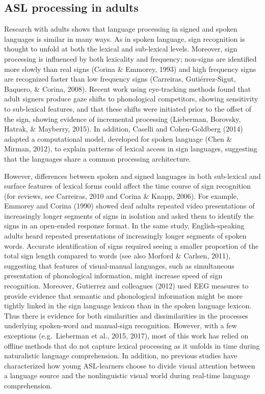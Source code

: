 \documentclass[oneside]{report}
\begin{document}
\subsection{ASL processing in adults}\label{asl-processing-in-adults}

Research with adults shows that language processing in signed and spoken
languages is similar in many ways. As in spoken language, sign
recognition is thought to unfold at both the lexical and sub-lexical
levels. Moreover, sign processing is influenced by both lexicality and
frequency; non-signs are identified more slowly than real signs (Corina
\& Emmorey, 1993) and high frequency signs are recognized faster than
low frequency signs (Carreiras, Gutiérrez-Sigut, Baquero, \& Corina,
2008). Recent work using eye-tracking methods found that adult signers
produce gaze shifts to phonological competitors, showing sensitivity to
sub-lexical features, and that these shifts were initiated prior to the
offset of the sign, showing evidence of incremental processing
(Lieberman, Borovsky, Hatrak, \& Mayberry, 2015). In addition, Caselli
and Cohen-Goldberg (2014) adapted a computational model, developed for
spoken language (Chen \& Mirman, 2012), to explain patterns of lexical
access in sign languages, suggesting that the languages share a common
processing architecture.

However, differences between spoken and signed languages in both
sub-lexical and surface features of lexical forms could affect the time
course of sign recognition (for reviews, see Carreiras, 2010 and Corina
\& Knapp, 2006). For example, Emmorey and Corina (1990) showed deaf
adults repeated video presentations of increasingly longer segments of
signs in isolation and asked them to identify the signs in an open-ended
response format. In the same study, English-speaking adults heard
repeated presentations of increasingly longer segments of spoken words.
Accurate identification of signs required seeing a smaller proportion of
the total sign length compared to words (see also Morford \& Carlsen,
2011), suggesting that features of visual-manual languages, such as
simultaneous presentation of phonological information, might increase
speed of sign recognition. Moreover, Gutierrez and colleagues (2012)
used EEG measures to provide evidence that semantic and phonological
information might be more tightly linked in the sign language lexicon
than in the spoken language lexicon. Thus there is evidence for both
similarities and dissimilarities in the processes underlying spoken-word
and manual-sign recognition. However, with a few exceptions
(e.g.~Lieberman et al., 2015, 2017), most of this work has relied on
offline methods that do not capture lexical processing as it unfolds in
time during naturalistic language comprehension. In addition, no
previous studies have characterized how young ASL-learners choose to
divide visual attention between a language source and the nonlinguistic
visual world during real-time language comprehension.
\end{document}
